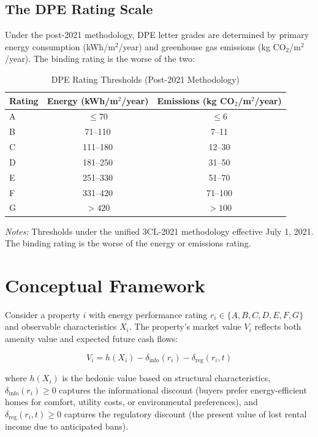 \documentclass[12pt]{article}
\begin{document}
\subsection{The DPE Rating Scale}

Under the post-2021 methodology, DPE letter grades are determined by primary energy consumption (kWh/m$^2$/year) and greenhouse gas emissions (kg CO$_2$/m$^2$/year). The binding rating is the worse of the two:

\begin{table}[H]
\centering
\caption{DPE Rating Thresholds (Post-2021 Methodology)}
\label{tab:thresholds}
\begin{tabular}{lcc}
\toprule
Rating & Energy (kWh/m$^2$/year) & Emissions (kg CO$_2$/m$^2$/year) \\
\midrule
A & $\leq 70$ & $\leq 6$ \\
B & 71--110 & 7--11 \\
C & 111--180 & 12--30 \\
D & 181--250 & 31--50 \\
E & 251--330 & 51--70 \\
F & 331--420 & 71--100 \\
G & $> 420$ & $> 100$ \\
\bottomrule
\end{tabular}
\begin{tablenotes}[flushleft]
\small
\item \textit{Notes:} Thresholds under the unified 3CL-2021 methodology effective July 1, 2021. The binding rating is the worse of the energy or emissions rating.
\end{tablenotes}
\end{table}


\section{Conceptual Framework}

Consider a property $i$ with energy performance rating $r_i \in \{A, B, C, D, E, F, G\}$ and observable characteristics $X_i$. The property's market value $V_i$ reflects both amenity value and expected future cash flows:

\begin{equation}
V_i = h(X_i) - \delta_{\text{info}}(r_i) - \delta_{\text{reg}}(r_i, t)
\end{equation}

where $h(X_i)$ is the hedonic value based on structural characteristics, $\delta_{\text{info}}(r_i) \geq 0$ captures the informational discount (buyers prefer energy-efficient homes for comfort, utility costs, or environmental preferences), and $\delta_{\text{reg}}(r_i, t) \geq 0$ captures the regulatory discount (the present value of lost rental income due to anticipated bans).
\end{document}

